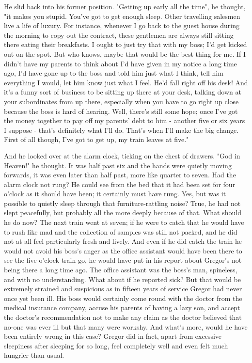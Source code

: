 He slid back into his former position. "Getting up early all the time", he thought, "it makes you stupid. You've got to get enough sleep. Other travelling salesmen live a life of luxury. For instance, whenever I go back to the guest house during the morning to copy out the contract, these gentlemen are always still sitting there eating their breakfasts. I ought to just try that with my boss; I'd get kicked out on the spot. But who knows, maybe that would be the best thing for me. If I didn't have my parents to think about I'd have given in my notice a long time ago, I'd have gone up to the boss and told him just what I think, tell him everything I would, let him know just what I feel. He'd fall right off his desk! And it's a funny sort of business to be sitting up there at your desk, talking down at your subordinates from up there, especially when you have to go right up close because the boss is hard of hearing. Well, there's still some hope; once I've got the money together to pay off my parents' debt to him - another five or six years I suppose - that's definitely what I'll do. That's when I'll make the big change. First of all though, I've got to get up, my train leaves at five."

And he looked over at the alarm clock, ticking on the chest of drawers. "God in Heaven!" he thought. It was half past six and the hands were quietly moving forwards, it was even later than half past, more like quarter to seven. Had the alarm clock not rung? He could see from the bed that it had been set for four o'clock as it should have been; it certainly must have rung. Yes, but was it possible to quietly sleep through that furniture-rattling noise? True, he had not slept peacefully, but probably all the more deeply because of that. What should he do now? The next train went at seven; if he were to catch that he would have to rush like mad and the collection of samples was still not packed, and he did not at all feel particularly fresh and lively. And even if he did catch the train he would not avoid his boss's anger as the office assistant would have been there to see the five o'clock train go, he would have put in his report about Gregor's not being there a long time ago. The office assistant was the boss's man, spineless, and with no understanding. What about if he reported sick? But that would be extremely strained and suspicious as in fifteen years of service Gregor had never once yet been ill. His boss would certainly come round with the doctor from the medical insurance company, accuse his parents of having a lazy son, and accept the doctor's recommendation not to make any claim as the doctor believed that no-one was ever ill but that many were workshy. And what's more, would he have been entirely wrong in this case? Gregor did in fact, apart from excessive sleepiness after sleeping for so long, feel completely well and even felt much hungrier than usual.

